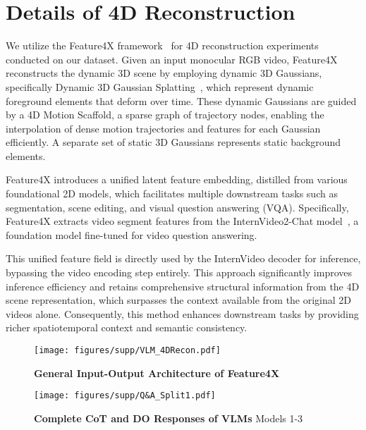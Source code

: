 \section{Details of 4D Reconstruction}
\label{sec:Details of Feature4x}
We utilize the Feature4X framework~\cite{zhou2025feature4x} for 4D reconstruction experiments conducted on our dataset. Given an input monocular RGB video, Feature4X reconstructs the dynamic 3D scene by employing dynamic 3D Gaussians, specifically Dynamic 3D Gaussian Splatting~\cite{kerbl2023gaussian, lei2024mosca}, which represent dynamic foreground elements that deform over time. These dynamic Gaussians are guided by a 4D Motion Scaffold, a sparse graph of trajectory nodes, enabling the interpolation of dense motion trajectories and features for each Gaussian efficiently. A separate set of static 3D Gaussians represents static background elements.

Feature4X introduces a unified latent feature embedding, distilled from various foundational 2D models, which facilitates multiple downstream tasks such as segmentation, scene editing, and visual question answering (VQA). Specifically, Feature4X extracts video segment features from the InternVideo2-Chat model~\cite{wang2024internvideo2,li2023videochat}, a foundation model fine-tuned for video question answering. 

This unified feature field is directly used by the InternVideo decoder for inference, bypassing the video encoding step entirely. This approach significantly improves inference efficiency and retains comprehensive structural information from the 4D scene representation, which surpasses the context available from the original 2D videos alone. Consequently, this method enhances downstream tasks by providing richer spatiotemporal context and semantic consistency.





\begin{figure*}[t]
  \centering
  \texttt{[image: figures/supp/VLM\_4DRecon.pdf]}\vspace{-3mm}
  \label{fig:4D_recon}
  \caption{\textbf{General Input-Output Architecture of Feature4X} }
\end{figure*}


\begin{figure*}[t]
  \centering
  \texttt{[image: figures/supp/Q\&A\_Split1.pdf]}\vspace{-3mm}
  \label{fig:Q&A_example}
  \caption{\textbf{Complete CoT and DO Responses of VLMs} Models 1-3}
\end{figure*}

